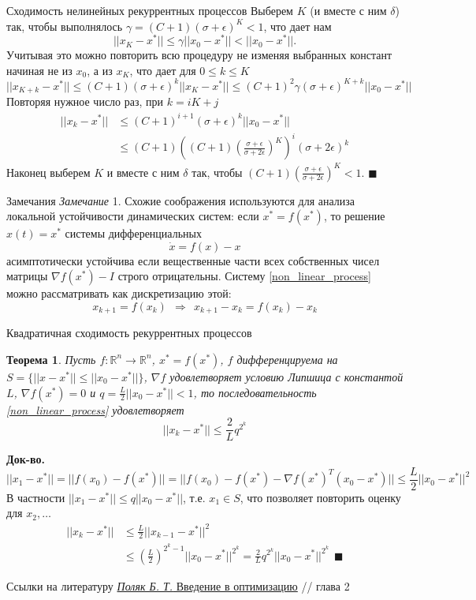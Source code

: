\documentclass[10pt, handout]{beamer}
\newcounter{thm}
\newtheorem{theorem_ru}[thm]{Теорема}
\begin{document}
\begin{frame}{Сходимость нелинейных рекуррентных процессов}
Выберем $K$ (и вместе с ним $\delta$) так, чтобы выполнялось $\gamma=(C+1)(\sigma+\epsilon)^K<1$, что дает нам
$$
||x_K-x^*||\leq\gamma||x_0-x^*||<||x_0-x^*||.
$$
\pause
Учитывая это можно повторить всю процедуру не изменяя выбранных констант начиная не из $x_0$, а из $x_K$, что дает для $0\leq k\leq K$
$$
||x_{K+k}-x^*||\leq (C+1)(\sigma+\epsilon)^k||x_K-x^*||\leq (C+1)^2\gamma(\sigma+\epsilon)^{K+k}||x_0-x^*||
$$
\pause
Повторяя нужное число раз, при $k=iK+j$
\begin{align*}
||x_k-x^*||&\leq (C+1)^{i+1}(\sigma+\epsilon)^k||x_0-x^*||\\
&\leq(C+1)\left((C+1)\left(\frac{\sigma+\epsilon}{\sigma+2\epsilon}\right)^K\right)^i(\sigma+2\epsilon)^k
\end{align*}
\pause
Наконец выберем $K$ и вместе с ним $\delta$ так, чтобы $(C+1)\left(\frac{\sigma+\epsilon}{\sigma+2\epsilon}\right)^K<1$. $\blacksquare$
\end{frame}

\begin{frame}{Замечания}
\textit{Замечание} 1. Схожие соображения используются для анализа локальной устойчивости динамических систем: если $x^*=f(x^*)$, то решение $x(t)=x^*$ системы дифференциальных 
$$
\dot{x}=f(x)-x
$$
асимптотически устойчива если вещественные части всех собственных чисел матрицы $\nabla f(x^*)-I$ строго отрицательны. Систему \eqref{non_linear_process} можно рассматривать как дискретизацию этой:
$$
x_{k+1}=f(x_k)~~\Rightarrow~~x_{k+1}-x_k=f(x_k)-x_k
$$
\end{frame}

\begin{frame}{Квадратичная сходимость рекуррентных процессов}
\begin{theorem_ru}
Пусть $f:\mathbb{R}^n\rightarrow\mathbb{R}^n$, $x^*=f(x^*)$, $f$ дифференцируема на $S=\{||x-x^*||\leq ||x_0-x^*||\}$, $\nabla f$ удовлетворяет условию Липшица с константой $L$, $\nabla f(x^*)=0$ и $q=\frac{L}{2}||x_0-x^*||<1$, то
последовательность \eqref{non_linear_process} удовлетворяет
$$
||x_k-x^*||\leq \frac{2}{L}q^{2^k}
$$
\end{theorem_ru}
\pause
\textbf{Док-во.}
$$
||x_1-x^*||= ||f(x_0)-f(x^*)||=||f(x_0)-f(x^*)-\nabla f(x^*)^T(x_0-x^*)||\leq \frac{L}{2}||x_0-x^*||^2
$$
\pause
В частности $||x_1-x^*||\leq q||x_0-x^*||$, т.е. $x_1\in S$, что позволяет повторить оценку для $x_2, \ldots$
\begin{align*}
||x_{k}-x^*||&\leq \frac{L}{2}||x_{k-1}-x^*||^2\\
&\leq \left(\frac{L}{2}\right)^{2^k-1}||x_0-x^*||^{2^k}=\frac{2}{L}q^{2^k}||x_0-x^*||^{2^k}~~\blacksquare
\end{align*}
\end{frame}

\begin{frame}{Ссылки на литературу}
\href{http://lab7.ipu.ru/files/polyak/polyak-optimizationintro.pdf}{\textit{Поляк Б. Т.} Введение 
в оптимизацию} // глава 2
\end{frame}
\end{document}
